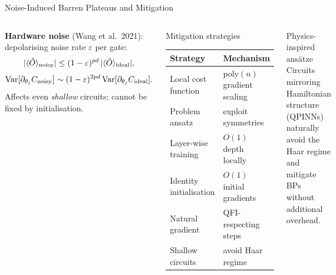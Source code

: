 \documentclass[aspectratio=169,10pt]{beamer}
\newcommand{\Variance}{\mathrm{Var}}
\begin{document}
\begin{frame}{Noise-Induced Barren Plateaus and Mitigation}
  \begin{columns}[T]
    \textbf{Hardware noise} (Wang et al.\ 2021):
    depolarising noise rate $\varepsilon$ per gate:
    \[
      |\langle\hat{O}\rangle_{\rm noisy}|
      \leq (1-\varepsilon)^{pd}\,
      |\langle\hat{O}\rangle_{\rm ideal}|,
    \]
    \[
      \Variance[\partial_{\theta_j}C_{\rm noisy}]
      \sim (1-\varepsilon)^{2pd}
           \,\Variance[\partial_{\theta_j}C_{\rm ideal}].
    \]
    Affects even \emph{shallow} circuits;
    cannot be fixed by initialisation.
    \begin{block}{Mitigation strategies}
      \footnotesize
      \begin{tabular}{ll}
        \toprule
        \textbf{Strategy} & \textbf{Mechanism} \\
        \midrule
        Local cost function & poly$(n)$ gradient scaling \\
        Problem ansatz & exploit symmetries \\
        Layer-wise training & $O(1)$ depth locally \\
        Identity initialisation & $O(1)$ initial gradients \\
        Natural gradient & QFI-respecting steps \\
        Shallow circuits & avoid Haar regime \\
        \bottomrule
      \end{tabular}
    \end{block}
    \begin{alertblock}{Physics-inspired ansätze}
      Circuits mirroring Hamiltonian structure (QPINNs)
      naturally avoid the Haar regime and mitigate BPs
      without additional overhead.
    \end{alertblock}
  \end{columns}
\end{frame}
\end{document}
